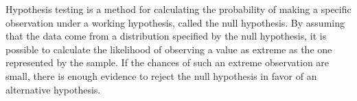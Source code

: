 Hypothesis testing is a method for calculating the probability of making a specific observation under a working hypothesis, called the null hypothesis. By assuming that the data come from a distribution specified by the null hypothesis, it is possible to calculate the likelihood of observing a value as extreme as the one represented by the sample. If the chances of such an extreme observation are small, there is enough evidence to reject the null hypothesis in favor of an alternative hypothesis. 

